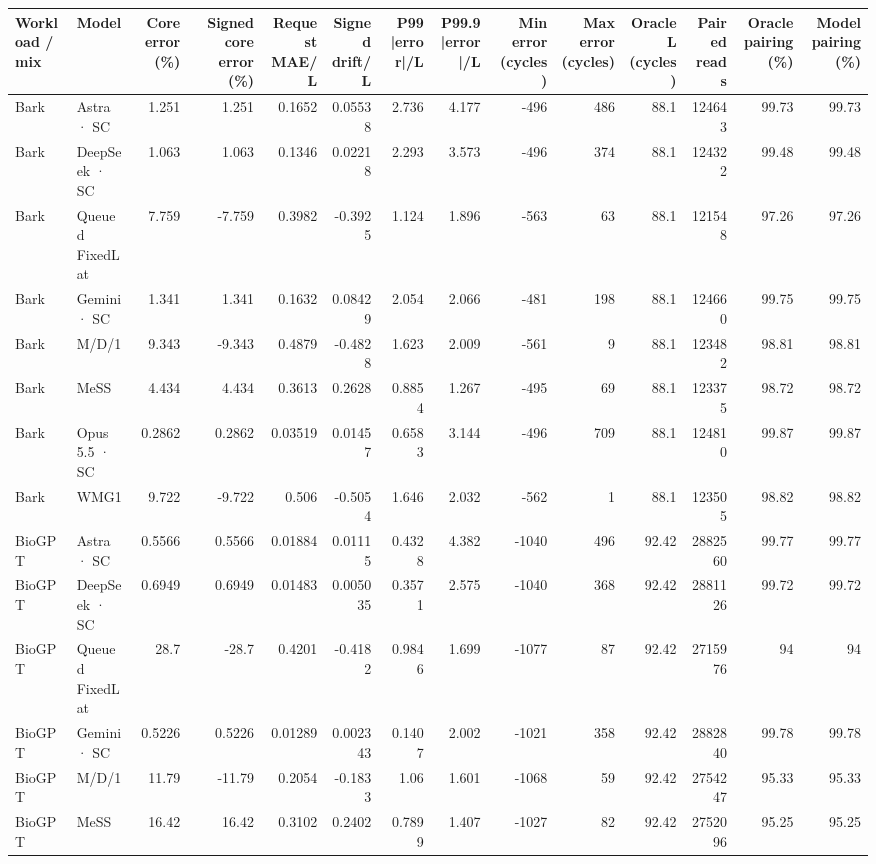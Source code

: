\begin{tabular}{llrrrrrrrrrrrr}
\toprule
Workload / mix & Model & Core error (\%) & Signed core error (\%) & Request MAE/L & Signed drift/L & P99 |error|/L & P99.9 |error|/L & Min error (cycles) & Max error (cycles) & Oracle L (cycles) & Paired reads & Oracle pairing (\%) & Model pairing (\%) \\
\midrule
Bark & Astra · SC & 1.251 & 1.251 & 0.1652 & 0.05538 & 2.736 & 4.177 & -496 & 486 & 88.1 & 124643 & 99.73 & 99.73 \\
Bark & DeepSeek · SC & 1.063 & 1.063 & 0.1346 & 0.02218 & 2.293 & 3.573 & -496 & 374 & 88.1 & 124322 & 99.48 & 99.48 \\
Bark & Queued FixedLat & 7.759 & -7.759 & 0.3982 & -0.3925 & 1.124 & 1.896 & -563 & 63 & 88.1 & 121548 & 97.26 & 97.26 \\
Bark & Gemini · SC & 1.341 & 1.341 & 0.1632 & 0.08429 & 2.054 & 2.066 & -481 & 198 & 88.1 & 124660 & 99.75 & 99.75 \\
Bark & M/D/1 & 9.343 & -9.343 & 0.4879 & -0.4828 & 1.623 & 2.009 & -561 & 9 & 88.1 & 123482 & 98.81 & 98.81 \\
Bark & MeSS & 4.434 & 4.434 & 0.3613 & 0.2628 & 0.8854 & 1.267 & -495 & 69 & 88.1 & 123375 & 98.72 & 98.72 \\
Bark & Opus 5.5 · SC & 0.2862 & 0.2862 & 0.03519 & 0.01457 & 0.6583 & 3.144 & -496 & 709 & 88.1 & 124810 & 99.87 & 99.87 \\
Bark & WMG1 & 9.722 & -9.722 & 0.506 & -0.5054 & 1.646 & 2.032 & -562 & 1 & 88.1 & 123505 & 98.82 & 98.82 \\
BioGPT & Astra · SC & 0.5566 & 0.5566 & 0.01884 & 0.01115 & 0.4328 & 4.382 & -1040 & 496 & 92.42 & 2882560 & 99.77 & 99.77 \\
BioGPT & DeepSeek · SC & 0.6949 & 0.6949 & 0.01483 & 0.005035 & 0.3571 & 2.575 & -1040 & 368 & 92.42 & 2881126 & 99.72 & 99.72 \\
BioGPT & Queued FixedLat & 28.7 & -28.7 & 0.4201 & -0.4182 & 0.9846 & 1.699 & -1077 & 87 & 92.42 & 2715976 & 94 & 94 \\
BioGPT & Gemini · SC & 0.5226 & 0.5226 & 0.01289 & 0.002343 & 0.1407 & 2.002 & -1021 & 358 & 92.42 & 2882840 & 99.78 & 99.78 \\
BioGPT & M/D/1 & 11.79 & -11.79 & 0.2054 & -0.1833 & 1.06 & 1.601 & -1068 & 59 & 92.42 & 2754247 & 95.33 & 95.33 \\
BioGPT & MeSS & 16.42 & 16.42 & 0.3102 & 0.2402 & 0.7899 & 1.407 & -1027 & 82 & 92.42 & 2752096 & 95.25 & 95.25 \\

\end{tabular}
